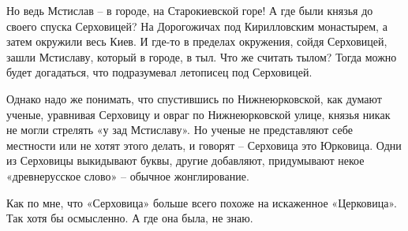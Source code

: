 Но ведь Мстислав – в городе, на Старокиевской горе! А где были князья до своего спуска Серховицей? На Дорогожичах под Кирилловским монастырем, а затем окружили весь Киев. И где-то в пределах окружения, сойдя Серховицей, зашли Мстиславу, который в городе, в тыл. Что же считать тылом? Тогда можно будет догадаться, что подразумевал летописец под Серховицей.

Однако надо же понимать, что спустившись по Нижнеюрковской, как думают ученые, уравнивая Серховицу и овраг по Нижнеюрковской улице, князья никак не могли стрелять «у зад Мстиславу». Но ученые не представляют себе местности или не хотят этого делать, и говорят – Серховица это Юрковица. Одни из Серховицы выкидывают буквы, другие добавляют, придумывают некое «древнерусское слово» – обычное жонглирование. 

Как по мне, что «Серховица» больше всего похоже на искаженное «Церковица». Так хотя бы осмысленно. А где она была, не знаю.
